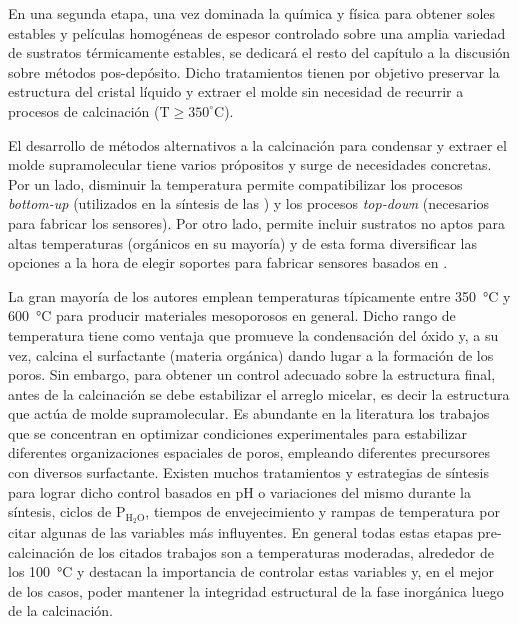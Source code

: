 	En una segunda etapa, una vez dominada la química y física para obtener soles estables y películas homogéneas de espesor controlado sobre una amplia variedad de sustratos térmicamente estables, se dedicará el resto del capítulo a la discusión sobre métodos pos-depósito. Dicho tratamientos tienen por objetivo preservar la estructura del cristal líquido y extraer el molde sin necesidad de recurrir a procesos de calcinación ($\text{T} \geq 350^\circ \text{C}$).

	El desarrollo de métodos alternativos a la calcinación para condensar y extraer el molde supramolecular tiene varios própositos y surge de necesidades concretas. Por un lado, disminuir la temperatura permite compatibilizar los procesos \textit{bottom-up} (utilizados en la síntesis de las \pdm) y los procesos \textit{top-down} (necesarios para fabricar los sensores). Por otro lado, permite incluir sustratos no aptos para altas temperaturas (orgánicos en su mayoría) y de esta forma diversificar las opciones a la hora de elegir soportes para fabricar sensores basados en \pdm.\cite{Doshi2000a,Wagner2013,Innocenzi2013,Soler-Illia2002a,Zhang2005}

	La gran mayoría de los autores emplean temperaturas típicamente entre \SI{350}{\celsius} y \SI{600}{\celsius} para producir materiales mesoporosos en general.\cite{Kresge1992,Beck1992,DiRenzo1997}  Dicho rango de temperatura tiene como ventaja que promueve la condensación del óxido y, a su vez, calcina el surfactante (materia orgánica) dando lugar a la formación de los poros. Sin embargo, para obtener un control adecuado sobre la estructura final, antes de la calcinación se debe estabilizar el arreglo micelar, es decir la estructura que actúa de molde supramolecular. Es abundante en la literatura los trabajos que se concentran en optimizar condiciones experimentales para estabilizar diferentes organizaciones espaciales de poros, empleando diferentes precursores con diversos surfactante\cite{Huo1996,Herregods2013,Grosso2001}. Existen muchos tratamientos y estrategias de síntesis para lograr dicho control basados en pH o variaciones del mismo durante la síntesis\cite{Doshi2000a,Soler-Illia2011,Boissiere2000,Huo1996,GonzalezSolveyra2017,Ichinose2002}, ciclos de P$_\text{H$_2$O}$\cite{Cagnol2002,Soler-Illia2012}, tiempos de envejecimiento\cite{Malfatti2009,Grosso2001} y rampas de temperatura\cite{Huang2002,Andrini2016,Soler-Illia2006,Rohlfing2005} por citar algunas de las variables más influyentes. En general todas estas etapas pre-calcinación de los citados trabajos son a temperaturas moderadas, alrededor de los \SI{100}{\celsius} y destacan la importancia de controlar estas variables y, en el mejor de los casos, poder mantener la integridad estructural de la fase inorgánica luego de la calcinación. 

